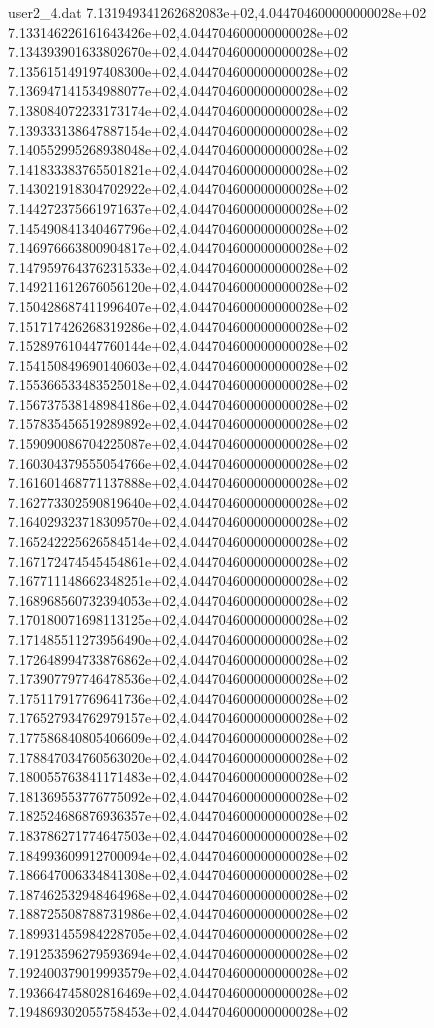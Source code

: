 \begin{filecontents}{user2_4.dat}
7.131949341262682083e+02,4.044704600000000028e+02
7.133146226161643426e+02,4.044704600000000028e+02
7.134393901633802670e+02,4.044704600000000028e+02
7.135615149197408300e+02,4.044704600000000028e+02
7.136947141534988077e+02,4.044704600000000028e+02
7.138084072233173174e+02,4.044704600000000028e+02
7.139333138647887154e+02,4.044704600000000028e+02
7.140552995268938048e+02,4.044704600000000028e+02
7.141833383765501821e+02,4.044704600000000028e+02
7.143021918304702922e+02,4.044704600000000028e+02
7.144272375661971637e+02,4.044704600000000028e+02
7.145490841340467796e+02,4.044704600000000028e+02
7.146976663800904817e+02,4.044704600000000028e+02
7.147959764376231533e+02,4.044704600000000028e+02
7.149211612676056120e+02,4.044704600000000028e+02
7.150428687411996407e+02,4.044704600000000028e+02
7.151717426268319286e+02,4.044704600000000028e+02
7.152897610447760144e+02,4.044704600000000028e+02
7.154150849690140603e+02,4.044704600000000028e+02
7.155366533483525018e+02,4.044704600000000028e+02
7.156737538148984186e+02,4.044704600000000028e+02
7.157835456519289892e+02,4.044704600000000028e+02
7.159090086704225087e+02,4.044704600000000028e+02
7.160304379555054766e+02,4.044704600000000028e+02
7.161601468771137888e+02,4.044704600000000028e+02
7.162773302590819640e+02,4.044704600000000028e+02
7.164029323718309570e+02,4.044704600000000028e+02
7.165242225626584514e+02,4.044704600000000028e+02
7.167172474545454861e+02,4.044704600000000028e+02
7.167711148662348251e+02,4.044704600000000028e+02
7.168968560732394053e+02,4.044704600000000028e+02
7.170180071698113125e+02,4.044704600000000028e+02
7.171485511273956490e+02,4.044704600000000028e+02
7.172648994733876862e+02,4.044704600000000028e+02
7.173907797746478536e+02,4.044704600000000028e+02
7.175117917769641736e+02,4.044704600000000028e+02
7.176527934762979157e+02,4.044704600000000028e+02
7.177586840805406609e+02,4.044704600000000028e+02
7.178847034760563020e+02,4.044704600000000028e+02
7.180055763841171483e+02,4.044704600000000028e+02
7.181369553776775092e+02,4.044704600000000028e+02
7.182524686876936357e+02,4.044704600000000028e+02
7.183786271774647503e+02,4.044704600000000028e+02
7.184993609912700094e+02,4.044704600000000028e+02
7.186647006334841308e+02,4.044704600000000028e+02
7.187462532948464968e+02,4.044704600000000028e+02
7.188725508788731986e+02,4.044704600000000028e+02
7.189931455984228705e+02,4.044704600000000028e+02
7.191253596279593694e+02,4.044704600000000028e+02
7.192400379019993579e+02,4.044704600000000028e+02
7.193664745802816469e+02,4.044704600000000028e+02
7.194869302055758453e+02,4.044704600000000028e+02

\end{filecontents}
